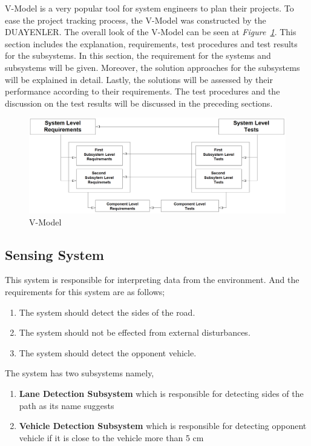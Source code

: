 \documentclass[a4paper,12pt]{article}
\begin{document}
	
	
	
	V-Model is a very popular tool for system engineers to plan their projects. To ease the project tracking process, the V-Model was constructed by the DUAYENLER. The overall look of the V-Model can be seen at \textit{Figure~\ref{fig:vmodel}}. This section includes the explanation, requirements, test procedures and test results for the subsystems. In this section, the requirement for the systems and subsystems will be given. Moreover, the solution approaches for the subsystems will be explained in detail. Lastly, the solutions will be assessed by their performance according to their requirements. The test procedures and the discussion on the test results will be discussed in the preceding sections.
	
	\begin{figure}[h]
		\includegraphics[width=\textwidth,center]{images/vModels/vmodel}
		\caption{V-Model}\label{fig:vmodel}
	\end{figure}
			
			
		
		\subsection{Sensing System}
	
				This system is responsible for interpreting data from the environment. And the requirements for this system are as follows;
			\begin{enumerate}
		\item The system should detect the sides of the road.
		\item The system should not be effected from external disturbances.
		\item The system should detect the opponent vehicle.
				\end{enumerate}	
				The system has two subsystems namely, 
				
			\begin{enumerate}
				\item \textbf{Lane Detection Subsystem} which is responsible for detecting sides of the path as its name suggests
				\item \textbf{Vehicle Detection Subsystem} which is responsible for detecting opponent vehicle if it is close to the vehicle more than 5 cm
			\end{enumerate}
	
\end{document}
